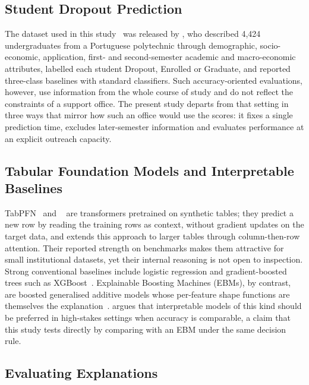 \subsection{Student Dropout Prediction}

The dataset used in this study~\citep{realinho2021uci} was released by \citet{realinho2022predicting},
who described 4,424 undergraduates from a Portuguese polytechnic through demographic,
socio-economic, application, first- and second-semester academic and macro-economic attributes,
labelled each student Dropout, Enrolled or Graduate, and reported three-class baselines with
standard classifiers. Such accuracy-oriented evaluations, however, use information from the whole
course of study and do not reflect the constraints of a support office. The present study departs
from that setting in three ways that mirror how such an office would use the scores: it fixes a
single prediction time, excludes later-semester information and evaluates performance at an
explicit outreach capacity.

\subsection{Tabular Foundation Models and Interpretable Baselines}

TabPFN~\citep{hollmann2025tabpfn} and \tabicl~\citep{qu2025tabicl} are transformers pretrained on
synthetic tables; they predict a new row by reading the training rows as context, without gradient
updates on the target data, and \tabicl extends this approach to larger tables through
column-then-row attention. Their reported strength on benchmarks makes them attractive for small
institutional datasets, yet their internal reasoning is not open to inspection. Strong conventional
baselines include logistic regression and gradient-boosted trees such as
XGBoost~\citep{chen2016xgboost}. Explainable Boosting Machines (EBMs), by contrast, are boosted
generalised additive models whose per-feature shape functions are themselves the
explanation~\citep{lou2013ebm, caruana2015intelligible}. \citet{rudin2019stop} argues that
interpretable models of this kind should be preferred in high-stakes settings when accuracy is
comparable, a claim that this study tests directly by comparing \tabicl with an EBM under the same
decision rule.

\subsection{Evaluating Explanations}

